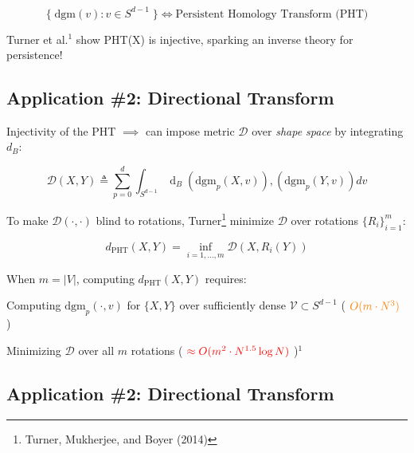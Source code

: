 \documentclass[
  letterpaper,
  DIV=11,
  numbers=noendperiod,
  oneside]{scrartcl}
\begin{document}
\[\{ \; \mathrm{dgm}(v) : v \in S^{d-1} \; \} \Leftrightarrow \text{Persistent Homology Transform (PHT)}\]

Turner et al.\(^1\) show PHT(X) is injective, sparking an inverse theory
for persistence!


\subsection{Application \#2: Directional
Transform}\label{application-2-directional-transform-2}

Injectivity of the PHT \(\implies\) can impose metric \(\mathcal{D}\)
over { \emph{shape space} } by integrating \(d_B\):

\[ \mathcal{D}(X, Y) \triangleq \sum_{p=0}^d \int_{S^{d-1}} \operatorname{d}_B\left(\mathrm{dgm}_p(X, v) \right), \left( \mathrm{dgm}_p(Y, v) \right) dv \]

To make \(\mathcal{D}(\cdot, \cdot)\) blind to rotations,
Turner\footnote{Turner, Mukherjee, and Boyer (2014)} minimize
\(\mathcal{D}\) over rotations \(\{R_i\}_{i=1}^m\):

\[ d_{\mathrm{PHT}}(X, Y) = \inf_{i = 1, \dots, m} \mathcal{D}(X, R_i(Y)) \]

When \(m = \lvert V \rvert\), computing \(d_{\mathrm{PHT}}(X, Y)\)
requires:

Computing \(\mathrm{dgm}_p(\cdot, v)\) for \(\{X,Y\}\) over sufficiently
dense \(\mathcal{V} \subset S^{d-1}\) (
\({\color{orange} O(m \cdot N^3)}\) )

Minimizing \(\mathcal{D}\) over all \(m\) rotations (
\({\color{red}\approx O(m^2 \cdot N^{1.5} \log N)}\) )\(^1\)


\subsection{Application \#2: Directional
Transform}\label{application-2-directional-transform-3}
\end{document}
